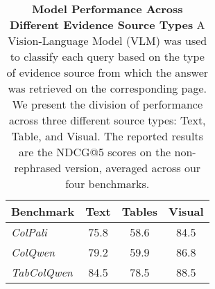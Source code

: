 \begin{table*}[t]
\footnotesize
\renewcommand{\arraystretch}{1.5} %
\setlength\tabcolsep{5pt} %
\caption{
\textbf{Model Performance Across Different Evidence Source Types} 
A Vision-Language Model (VLM) was used to classify each query based on the type of evidence source from which the answer was retrieved on the corresponding page. We present the division of performance across three different source types: Text, Table, and Visual. The reported results are the NDCG@5 scores on the non-rephrased version, averaged across our four benchmarks.}
\begin{tabular*}{\linewidth}{@{\extracolsep{\fill}}lccc} 
\toprule
\textbf{Benchmark} & \textbf{Text} & \textbf{Tables} & \textbf{Visual}  \\
\midrule
\textit{ColPali}  & 75.8 & 58.6 & 84.5    \\
\textit{ColQwen}   & 79.2 & 59.9 & 86.8    \\
\textit{TabColQwen}  & 84.5 & 78.5 & 88.5    \\
\bottomrule
\end{tabular*}
\label{Table:model_comparisons_on_labels}
\end{table*}



